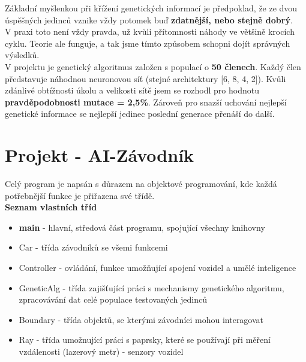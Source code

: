 \documentclass[a4paper,12pt]{article}
\newcommand{\tab}
{
    \hspace*{1em}
}
\begin{document}
        \vspace{0.75cm}
        Základní myšlenkou při křížení genetických informací je předpoklad, že ze dvou úspěšných
        jedinců vznike vždy potomek buď \textbf{zdatnější, nebo stejně dobrý}.\\
        V praxi toto není vždy pravda, už kvůli přítomnosti náhody ve většině krocích cyklu. 
        Teorie ale funguje, a tak jsme tímto způsobem schopni dojít správných výsledků.
        \\

        V projektu je genetický algoritmus založen s populací o \textbf{50 členech}. 
        Každý člen představuje náhodnou neuronovou síť (stejné architektury [6, 8, 4, 2]).
        Kvůli zdánlivé obtížnosti úkolu a velikosti sítě jsem se rozhodl pro hodnotu 
        \textbf{pravděpodobnosti mutace = 2,5\%}. Zároveň pro snazší uchování nejlepší 
        genetické informace se nejlepší jedinec poslední generace přenáší do další.

    \pagebreak
    \section{Projekt - AI-Závodník}
        \tab Celý program je napsán s důrazem na objektové programování, kde každá potřebnější funkce 
        je přiřazena své třídě.
        \\

        \textbf{Seznam vlastních tříd}
        \begin{itemize}[noitemsep]
            \vspace{-0.5em}
            \item \textbf{main} - hlavní, středová část programu, spojující všechny knihovny
            \item Car - třída závodníků se všemi funkcemi
            \item Controller - ovládání, funkce umožňující spojení vozidel a umělé inteligence
            \item GeneticAlg - třída zajišťující práci s mechanismy genetického algoritmu,
                zpracovávání dat celé populace testovaných jedinců
            \item Boundary - třída objektů, se kterými závodníci mohou interagovat
            \item Ray - třída umožnující práci s paprsky, které se používají při měření vzdálenosti
                (lazerový metr) - senzory vozidel
        \end{itemize}
\end{document}
